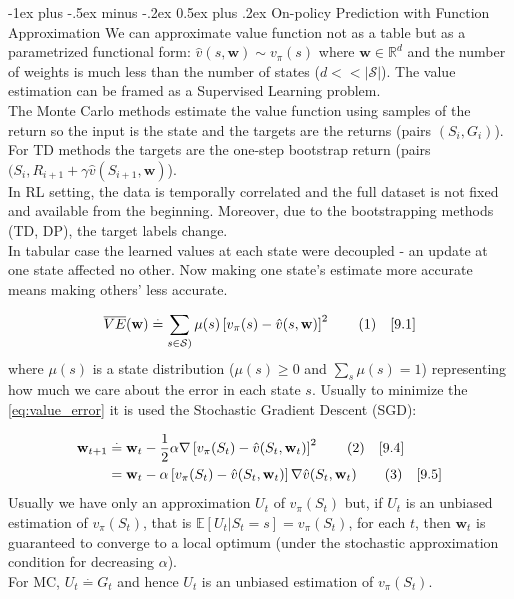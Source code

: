 \documentclass[10pt,landscape]{article}
\makeatletter
\renewcommand{\section}{\@startsection{section}{1}{0mm}%
                                {-1ex plus -.5ex minus -.2ex}%
                                {0.5ex plus .2ex}%
                                {\normalfont\large\bfseries}}
\newcommand\numberthis{\addtocounter{equation}{1}\tag{\theequation}}
\makeatother
\begin{document}
\begin{multicols}{3}

\section{On-policy Prediction with Function Approximation}
We can approximate value function not as a table but as a parametrized functional form: $\hat{v}(s,\mathbf{w}) \sim v_{\pi}(s)$ where $\mathbf{w} \in \mathbb{R}^d$ and the number of weights is much less than the number of states ($d << |\mathcal{S}|$).
The value estimation can be framed as a Supervised Learning problem.\\
The Monte Carlo methods estimate the value function using samples of the return so the input is the state and the targets are the returns (pairs $(S_i, G_i)$). \\
For TD methods the targets are the one-step bootstrap return (pairs $(S_i, R_{i+1} + \gamma \hat{v}(S_{i+1}, \mathbf{w})$).\\
In RL setting, the data is temporally correlated and the full dataset is not fixed and available from the beginning. Moreover, due to the bootstrapping methods (TD, DP), the target labels change.\\
In tabular case the learned values at each state were decoupled -  an update at one state affected no other.
Now making one state's estimate more accurate means making others' less accurate.

\begin{equation}
    \overline{VE}(\mathbf{w})  \stackrel{.}{=} \sum_{s \in \mathcal{S})} \mu(s) \left [ v_{\pi}(s) - \hat{v}(s, \mathbf{w}) \right ]^2 \label{eq:value_error} \numberthis \quad [9.1]  
\end{equation}
where $\mu(s)$ is a state distribution ($\mu(s) \ge 0$ and $\sum_s \mu(s) = 1$) representing how much we care about the error in each state $s$.
Usually to minimize the \ref{eq:value_error} it is used the Stochastic Gradient Descent (SGD):

\begin{align*}
    \mathbf{w}_{t+1} & \stackrel{.}{=} \mathbf{w}_{t} - \frac{1}{2} \alpha \nabla \left [ v_{\pi}(S_t) - \hat{v}(S_t, \mathbf{w}_t) \right ]^2 \numberthis \quad [9.4]\\
& = \mathbf{w}_{t} - \alpha \left [ v_{\pi}(S_t) - \hat{v}(S_t, \mathbf{w}_t) \right ] \nabla \hat{v}(S_t, \mathbf{w}_t) \numberthis \quad [9.5]
\end{align*}
Usually we have only an approximation $U_t$ of $v_{\pi}(S_t)$ but, if $U_t$ is an unbiased estimation of $v_{\pi}(S_t)$, that is $\mathbb{E}[U_t|S_t=s] = v_{\pi}(S_t)$, for each $t$, then $\mathbf{w}_t$ is guaranteed to converge to a local optimum (under the stochastic approximation condition for decreasing $\alpha$). \\
For MC, $U_t \stackrel{.}{=} G_t$ and hence $U_t$ is an unbiased estimation of $v_{\pi}(S_t)$.


\end{multicols}
\end{document}
